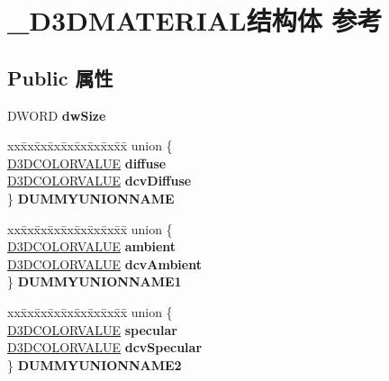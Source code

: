 \hypertarget{struct___d3_d_m_a_t_e_r_i_a_l}{}\section{\+\_\+\+D3\+D\+M\+A\+T\+E\+R\+I\+A\+L结构体 参考}
\label{struct___d3_d_m_a_t_e_r_i_a_l}
\subsection*{Public 属性}
\begin{DoxyCompactItemize}
\item 
\mbox{\label{struct___d3_d_m_a_t_e_r_i_a_l_a0e860db6b50fc2cec208efa859308cc1}} 
D\+W\+O\+RD {\bfseries dw\+Size}
\item 
\mbox{\label{struct___d3_d_m_a_t_e_r_i_a_l_ad18d2ebf102a3c405351377570ea4c1a}} 
\begin{tabbing}
xx\=xx\=xx\=xx\=xx\=xx\=xx\=xx\=xx\=\kill
union \{\\
\>\hyperlink{struct___d3_d_c_o_l_o_r_v_a_l_u_e}{D3DCOLORVALUE} {\bfseries diffuse}\\
\>\hyperlink{struct___d3_d_c_o_l_o_r_v_a_l_u_e}{D3DCOLORVALUE} {\bfseries dcvDiffuse}\\
\} {\bfseries DUMMYUNIONNAME}\\

\end{tabbing}\item 
\mbox{\label{struct___d3_d_m_a_t_e_r_i_a_l_a8441423edcdaf4f875270f992be3b40e}} 
\begin{tabbing}
xx\=xx\=xx\=xx\=xx\=xx\=xx\=xx\=xx\=\kill
union \{\\
\>\hyperlink{struct___d3_d_c_o_l_o_r_v_a_l_u_e}{D3DCOLORVALUE} {\bfseries ambient}\\
\>\hyperlink{struct___d3_d_c_o_l_o_r_v_a_l_u_e}{D3DCOLORVALUE} {\bfseries dcvAmbient}\\
\} {\bfseries DUMMYUNIONNAME1}\\

\end{tabbing}\item 
\mbox{\label{struct___d3_d_m_a_t_e_r_i_a_l_adb2252ff5345b2967f24a7a44e038b32}} 
\begin{tabbing}
xx\=xx\=xx\=xx\=xx\=xx\=xx\=xx\=xx\=\kill
union \{\\
\>\hyperlink{struct___d3_d_c_o_l_o_r_v_a_l_u_e}{D3DCOLORVALUE} {\bfseries specular}\\
\>\hyperlink{struct___d3_d_c_o_l_o_r_v_a_l_u_e}{D3DCOLORVALUE} {\bfseries dcvSpecular}\\
\} {\bfseries DUMMYUNIONNAME2}\\


\end{tabbing}
\end{DoxyCompactItemize}
